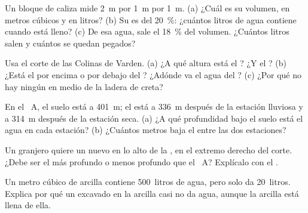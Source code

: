 \begin{exercise}[$\star\star$]\label{exo:g6:water-underground:6}
Un bloque de caliza mide 2~m por 1~m por 1~m. (a) ¿Cuál es su volumen, en
metros cúbicos y en litros? (b) Su  es del 20~\%: ¿cuántos litros
de agua contiene cuando está lleno? (c) De esa agua, sale el 18~\% del
volumen. ¿Cuántos litros salen y cuántos se quedan pegados?
\end{exercise}

\begin{exercise}[$\star\star$]\label{exo:g6:water-underground:7}
Usa el corte de las Colinas de Varden. (a) ¿A qué altura está el
? ¿Y el ? (b) ¿Está el  por encima o por debajo del
? ¿Adónde va el agua del ? (c) ¿Por qué no hay ningún
 en medio de la ladera de creta?
\end{exercise}

\begin{exercise}[$\star\star$]\label{exo:g6:water-underground:8}
En el ~A, el suelo está a 401~m; el  está a 336~m después
de la estación lluviosa y a 314~m después de la estación seca. (a) ¿A qué
profundidad bajo el suelo está el agua en cada estación? (b) ¿Cuántos
metros baja el  entre las dos estaciones?
\end{exercise}

\begin{exercise}[$\star\star$]\label{exo:g6:water-underground:9}
Un granjero quiere un  nuevo en lo alto de la , en el extremo
derecho del corte. ¿Debe ser el  más profundo o menos profundo que el
~A? Explícalo con el .
\end{exercise}

\begin{exercise}[$\star\star$]\label{exo:g6:water-underground:10}
Un metro cúbico de arcilla contiene 500~litros de agua, pero solo da
20~litros. Explica por qué un  excavado en la arcilla casi no da agua,
aunque la arcilla está llena de ella.
\end{exercise}

